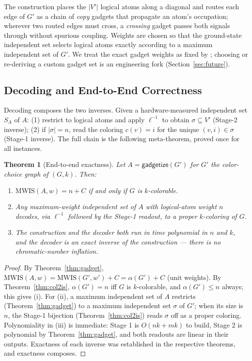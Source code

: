 \documentclass[11pt]{article}
\newtheorem{theorem}{Theorem}[section]
\theoremstyle{definition}
\theoremstyle{remark}
\newcommand{\MWIS}{\mathrm{MWIS}}
\newcommand{\indep}{\alpha}
\begin{document}
The construction places the $|V'|$ logical atoms along a diagonal and routes each
edge of $G'$ as a chain of \emph{copy} gadgets that propagate an atom's
occupation; wherever two routed edges must cross, a \emph{crossing} gadget passes
both signals through without spurious coupling. Weights are chosen so that the
ground-state independent set selects logical atoms exactly according to a maximum
independent set of $G'$. We treat the exact gadget weights as fixed by
\cite{Nguyen2023}; choosing or re-deriving a custom gadget set is an engineering
fork (Section~\ref{sec:future}).

\subsection{Decoding and End-to-End Correctness}
\label{sec:decode}

Decoding composes the two inverses. Given a hardware-measured independent set
$S_A$ of $A$: (1) restrict to logical atoms and apply $\ell^{-1}$ to obtain
$\sigma\subseteq V'$ (Stage-2 inverse); (2) if $|\sigma|=n$, read the coloring
$c(v)=i$ for the unique $(v,i)\in\sigma$ (Stage-1 inverse). The full chain is the
following meta-theorem, proved once for all instances.

\begin{theorem}[End-to-end exactness]
\label{thm:endtoend}
Let $A=\mathsf{gadgetize}(G')$ for $G'$ the color-choice graph of $(G,k)$. Then:
\begin{enumerate}[label=(\roman*),leftmargin=2.2em]
  \item $\MWIS(A,w) = n + C$ if and only if $G$ is $k$-colorable.
  \item Any maximum-weight independent set of $A$ with logical-atom weight $n$
        decodes, via $\ell^{-1}$ followed by the Stage-1 readout, to a proper
        $k$-coloring of $G$.
  \item The construction and the decoder both run in time polynomial in $n$ and
        $k$, and the decoder is an exact inverse of the construction --- there is
        no chromatic-number inflation.
\end{enumerate}
\end{theorem}

\begin{proof}
By Theorem~\ref{thm:gadget}, $\MWIS(A,w)=\MWIS(G',w')+C=\indep(G')+C$ (unit
weights). By Theorem~\ref{thm:col2is}, $\indep(G')=n$ iff $G$ is $k$-colorable, and
$\indep(G')\le n$ always; this gives (i). For (ii), a maximum independent set of
$A$ restricts (Theorem~\ref{thm:gadget}) to a maximum independent set $\sigma$ of
$G'$; when its size is $n$, the Stage-1 bijection (Theorem~\ref{thm:col2is}) reads
$\sigma$ off as a proper coloring. Polynomiality in (iii) is immediate: Stage 1 is
$O(nk+mk)$ to build, Stage 2 is polynomial by Theorem~\ref{thm:gadget}, and both
readouts are linear in their outputs. Exactness of each inverse was established in
the respective theorems, and exactness composes.
\end{proof}
\end{document}
